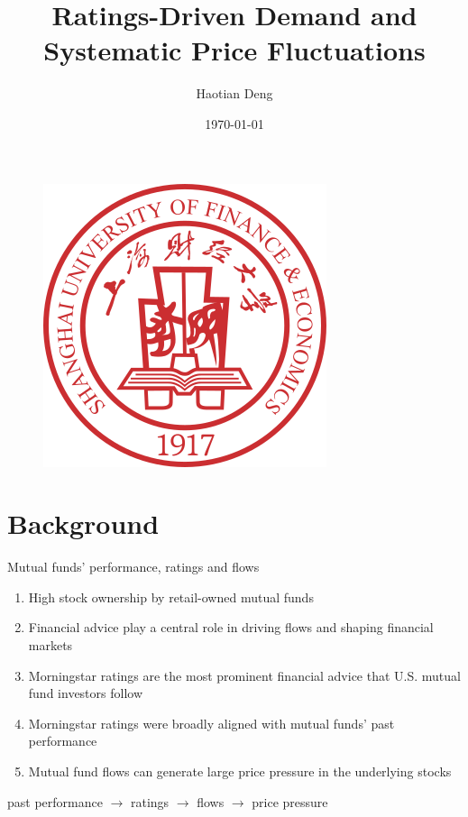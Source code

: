 \documentclass[UTF8, 16pt]{beamer}
\author[Haotian Deng] %
{
Haotian Deng
}
\title[Ratings-Driven Demand and Systematic Price Fluctuations]{Ratings-Driven Demand and \\ Systematic Price Fluctuations}
\institute[SUFE]
{
Shanghai University of Finance and Economics
}
\date[]
{\today}
\begin{document}
\begin{CJK*}{UTF8}{gbsn}

\begin{frame}[noframenumbering]
	\titlepage
	\vspace{-0.5cm}
    \begin{figure}[htpb] 
        \begin{center}
            \includegraphics[width=0.19 \linewidth]{sufe_logo.png}
        \end{center}  
    \end{figure}
\end{frame}


\section{Background}

\begin{frame}{Mutual funds' performance, ratings and flows}
	\begin{enumerate}
		\item High stock ownership by \alert{retail-owned mutual funds}
		\item \alert{Financial advice} play a central role in  \alert{driving flows} and shaping financial markets
		\item \alert{Morningstar ratings} are the most prominent financial advice that U.S. mutual fund investors follow
		\item Morningstar ratings were broadly aligned with mutual funds’ \alert{past performance}
		\item Mutual fund flows can generate large \alert{price pressure} in the underlying stocks
	\end{enumerate}
	\center past performance $\rightarrow$ ratings $\rightarrow$ flows $\rightarrow$ price pressure
\end{frame}


\end{CJK*}
\end{document}
